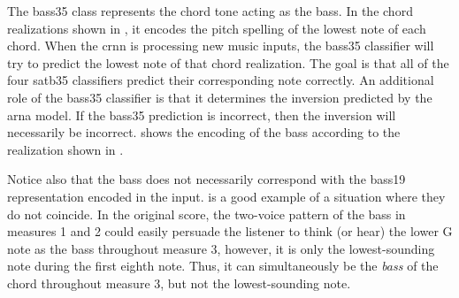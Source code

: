 
The \gls{bass35} class represents the chord tone acting as
the bass. In the chord realizations shown in
, it encodes the pitch spelling of the
lowest note of each chord. When the \gls{crnn} is processing
new music inputs, the \gls{bass35} classifier will try to
predict the lowest note of that chord realization. The goal
is that all of the four \gls{satb35} classifiers predict
their corresponding note correctly. An additional role of
the \gls{bass35} classifier is that it determines the
inversion predicted by the \gls{arna} model. If the
\gls{bass35} prediction is incorrect, then the inversion
will necessarily be incorrect.  shows the
encoding of the bass according to the realization shown in
.

Notice also that the bass does not necessarily correspond
with the \gls{bass19} representation encoded in the input.
 is a good example of a situation
where they do not coincide. In the original score, the
two-voice pattern of the bass in measures 1 and 2 could
easily persuade the listener to think (or hear) the lower G
note as the bass throughout measure 3, however, it is only
the lowest-sounding note during the first eighth note. Thus,
it can simultaneously be the \emph{bass} of the chord
throughout measure 3, but not the lowest-sounding note.



